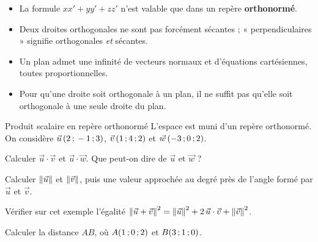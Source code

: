 \begin{attention}
\begin{itemize}[label={\color{otOrange}\textbullet},leftmargin=1.4em,itemsep=0.6mm,topsep=0.5mm]
  \item La formule $xx'+yy'+zz'$ n'est valable que dans un repère \textbf{orthonormé}.
  \item Deux droites orthogonales ne sont pas forcément sécantes ; « perpendiculaires » signifie orthogonales \emph{et} sécantes.
  \item Un plan admet une infinité de vecteurs normaux et d'équations cartésiennes, toutes proportionnelles.
  \item Pour qu'une droite soit orthogonale à un plan, il ne suffit pas qu'elle soit orthogonale à une seule droite du plan.
\end{itemize}
\end{attention}

\exercices
{}

\begin{exercice}[1]{Produit scalaire en repère orthonormé}
L'espace est muni d'un repère orthonormé. On considère $\vec u\,(2\,{;}\,-1\,{;}\,3)$, $\vec v\,(1\,{;}\,4\,{;}\,2)$ et $\vec w\,(-3\,{;}\,0\,{;}\,2)$.
\begin{questions}
  \item Calculer $\vec u\cdot\vec v$ et $\vec u\cdot\vec w$. Que peut-on dire de $\vec u$ et $\vec w$ ?
  \item Calculer $\left\lVert\vec u\right\rVert$ et $\left\lVert\vec v\right\rVert$, puis une valeur approchée au degré près de l'angle formé par $\vec u$ et $\vec v$.
  \item Vérifier sur cet exemple l'égalité $\left\lVert\vec u+\vec v\right\rVert^2=\left\lVert\vec u\right\rVert^2+2\,\vec u\cdot\vec v+\left\lVert\vec v\right\rVert^2$.
  \item Calculer la distance $AB$, où $A(1\,{;}\,0\,{;}\,2)$ et $B(3\,{;}\,1\,{;}\,0)$.
\end{questions}
\end{exercice}

